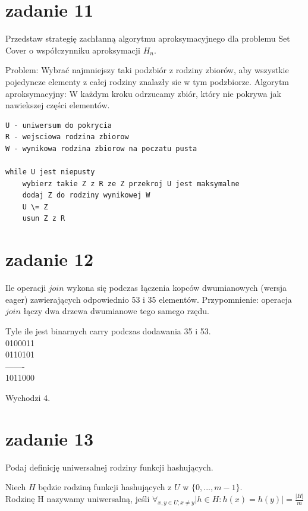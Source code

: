 \section{zadanie 11}
\begin{framed}
Przedstaw strategię zachłanną algorytmu aproksymacyjnego dla problemu Set Cover o współczynniku aproksymacji $H_n$.
\end{framed}
Problem: Wybrać najmniejszy taki podzbiór z rodziny zbiorów, aby wszystkie pojedyncze elementy z całej rodziny znalazły sie w tym podzbiorze.
Algorytm aproksymacyjny: W każdym kroku odrzucamy zbiór, który nie pokrywa jak nawiekszej części elementów.
\begin{lstlisting}
U - uniwersum do pokrycia
R - wejsciowa rodzina zbiorow
W - wynikowa rodzina zbiorow na poczatu pusta

while U jest niepusty
    wybierz takie Z z R ze Z przekroj U jest maksymalne
    dodaj Z do rodziny wynikowej W
    U \= Z
    usun Z z R
\end{lstlisting}

\section{zadanie 12}
\begin{framed}
Ile operacji $join$ wykona się podczas łączenia kopców dwumianowych (wersja eager) zawierających odpowiednio 53 i 35 elementów.
Przypomnienie: operacja $join$ łączy dwa drzewa dwumianowe tego samego rzędu.
\end{framed}

Tyle ile jest binarnych carry podczas dodawania 35 i 53.\\
0100011\\
0110101\\
——-\\
1011000

Wychodzi 4.

\section{zadanie 13}
\begin{framed}
Podaj definicję uniwersalnej rodziny funkcji hashujących.
\end{framed}

Niech $H$ będzie rodziną funkcji hashujących z $U$ w $\{0,...,m-1\}$.\\ Rodzinę H nazywamy uniwersalną, jeśli $\forall_{x,y\in U ;x\neq y} |{h \in H : h(x)=h(y)}|= \frac {|H|} m$
 
